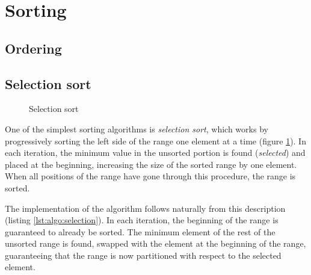 \section{Sorting}

\subsection{Ordering}
\label{subsec:algo:ordering}

\subsection{Selection sort}

\begin{figure}[p]
    \centering
    
    \vspace{2\baselineskip}
    
    \caption{Selection sort}
    \label{fig:algo:selection}
\end{figure}

One of the simplest sorting algorithms is \textit{selection sort}, which works
by progressively sorting the left side of the range one element at a time
(figure \ref{fig:algo:selection}).  In each iteration, the minimum value in the
unsorted portion is found (\emph{selected}) and placed at the beginning,
increasing the size of the sorted range by one element.  When all positions of
the range have gone through this procedure, the range is sorted.

The implementation of the algorithm follows naturally from this description
(listing \ref{lst:algo:selection}).  In each iteration, the beginning of the
range is guaranteed to already be sorted.  The minimum element of the rest of
the unsorted range is found, swapped with the element at the beginning of the
range, guaranteeing that the range is now partitioned with respect to the
selected element.
